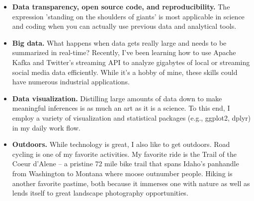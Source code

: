 \documentclass[11pt,letterpaper,sans]{moderncv}        %
\begin{document}
\begin{itemize}

\item{\textbf{Data transparency, open source code, and reproducibility.} The expression 'standing on the shoulders of giants' is most applicable in science and coding when you can actually use previous data and analytical tools.}

\vspace{4pt}

\item{\textbf{Big data.} What happens when data gets really large and needs to be summarized in real-time? Recently, I've been learning how to use Apache Kafka and Twitter's streaming API to analyze gigabytes of local or streaming social media data efficiently. While it's a hobby of mine, these skills could have numerous industrial applications.}

\vspace{4pt}

\item{\textbf{Data visualization.} Distilling large amounts of data down to make meaningful inferences is as much an art as it is a science. To this end, I employ a variety of visualization and statistical packages (e.g., ggplot2, dplyr) in my daily work flow.}

\vspace{4pt}

\item{\textbf{Outdoors.} While technology is great, I also like to get outdoors. Road cycling is one of my favorite activities. My favorite ride is the Trail of the Coeur d'Alene -- a pristine 72 mile bike trail that spans Idaho's panhandle from Washington to Montana where moose outnumber people. Hiking is another favorite pastime, both because it immerses one with nature as well as lends itself to great landscape photography opportunities.}

\vspace{4pt}


\end{itemize}





\end{document}
